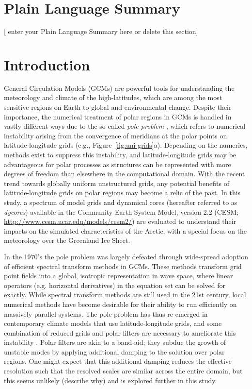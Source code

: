 \documentclass[draft]{agujournal2019}
\begin{document}
\section*{Plain Language Summary}
[ enter your Plain Language Summary here or delete this section]


%
%

\section{Introduction}

General Circulation Models (GCMs) are powerful tools for understanding the meteorology and climate of the high-latitudes, which are among the most sensitive regions on Earth to global and environmental change. Despite their importance, the numerical treatment of polar regions in GCMs is handled in vastly-different ways due to the so-called \textit{pole-problem} \cite{W2007JMSJ}, which refers to numerical instability arising from the convergence of meridians at the polar points on latitude-longitude grids (e.g., Figure~\ref{fig:uni-grids}a). Depending on the numerics, methods exist to suppress this instability, and latitude-longitude grids may be advantageous for polar processes as structures can be represented with more degrees of freedom than elsewhere in the computational domain. With the recent trend towards globally uniform unstructured grids, any potential benefits of latitude-longitude grids on polar regions may become a relic of the past. In this study, a spectrum of model grids and dynamical cores (hereafter referred to as \textit{dycores}) available in the Community Earth System Model, version 2.2 (CESM; \url{http://www.cesm.ucar.edu/models/cesm2/}) are evaluated to understand their impacts on the simulated characteristics of the Arctic, with a special focus on the meteorology over the Greenland Ice Sheet.

In the 1970's the pole problem was largely defeated through wide-spread adoption of efficient spectral transform methods in GCMs. These methods transform grid point fields into a global, isotropic representation in wave space, where linear operators (e.g. horizontal derivatives) in the equation set can be solved for exactly. While spectral transform methods are still used in the 21st century, local numerical methods have become desirable for their ability to run efficiently on massively parallel systems. The pole-problem has thus re-emerged in contemporary climate models that use latitude-longitude grids, and some combination of reduced grids and polar filters are necessary to ameliorate this instability \cite{JW2010LNCSE}. Polar filters are akin to a band-aid; they subdue the growth of unstable modes by applying additional damping to the solution over polar regions. One might expect that this additional damping reduces the effective resolution such that the resolved scales are similar across the entire domain, but this seems unlikely (describe why) and is explored further in this study.
\end{document}
